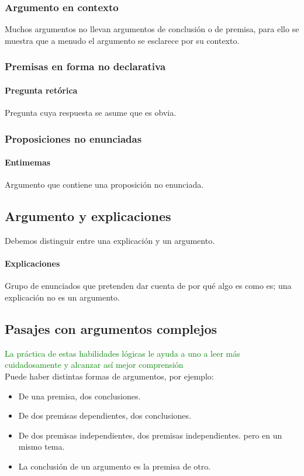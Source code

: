 \documentclass[10pt]{book} 						%
\begin{document}
\subsubsection{Argumento en contexto}
Muchos argumentos no llevan argumentos de conclusión o de premisa, para ello se muestra que a menudo el argumento se esclarece por su contexto. 
\subsubsection{Premisas en forma no declarativa}
\paragraph{Pregunta retórica}
Pregunta cuya respuesta se asume que es obvia.
\subsubsection{Proposiciones no enunciadas}
\paragraph{Entimemas}
Argumento que contiene una proposición no enunciada.
\subsection{Argumento y explicaciones}
Debemos distinguir entre una explicación y un argumento.
\paragraph{Explicaciones}
Grupo de enunciados que pretenden dar cuenta de por qué algo es como es; una explicación no es un argumento.
\subsection{Pasajes con argumentos complejos}
\textcolor{green}{La práctica de estas habilidades lógicas le ayuda a uno a leer más cuidadosamente y alcanzar así mejor comprensión}\\
Puede haber distintas formas de argumentos, por ejemplo:
\begin{itemize}
\item De una premisa, dos conclusiones.
\item De dos premisas dependientes, dos conclusiones.
\item De dos premisas independientes, dos premisas independientes. pero en un mismo tema.
\item La conclusión de un argumento es la premisa de otro.
\end{itemize}
\end{document}
